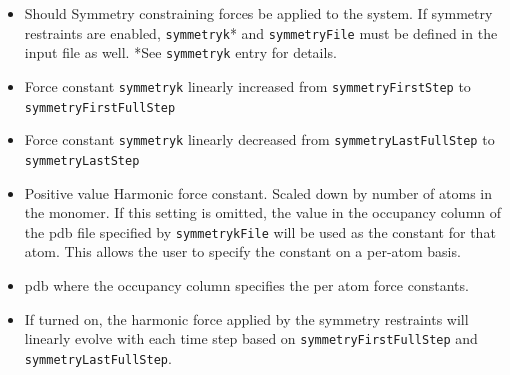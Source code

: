 \begin{itemize}
\item
{}
{Should Symmetry constraining forces be applied to the system.  If symmetry restraints are enabled,
{\tt symmetryk}* and {\tt symmetryFile} must be defined in the 
input file as well.  *See {\tt symmetryk} entry for details.}

\item
{}
{Force constant {\tt symmetryk} linearly increased from {\tt symmetryFirstStep} to {\tt symmetryFirstFullStep}}

\item
{}
{Force constant {\tt symmetryk} linearly decreased from {\tt symmetryLastFullStep} to {\tt symmetryLastStep}} 

\item
{}
{Positive value}
{Harmonic force constant.  Scaled down by number of atoms in the monomer.  If this setting is omitted, the value in the occupancy column
of the pdb file specified by {\tt symmetrykFile} will be used as the constant for that atom.  
This allows the user to specify the constant on a per-atom basis.}

\item
{}
{pdb where the occupancy column specifies the per atom force constants.}

\item
{}
{If turned on, the harmonic force applied by the symmetry restraints will linearly evolve with each time step based on
{\tt symmetryFirstFullStep} and {\tt symmetryLastFullStep}.}


\end{itemize}

